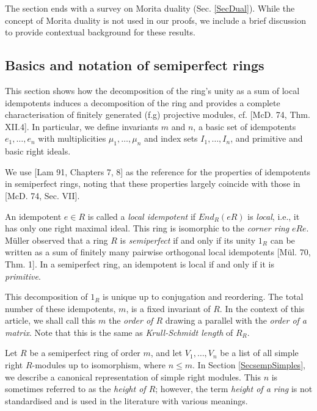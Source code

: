 \documentclass[11pt]{article}
\theoremstyle{plain}
\theoremstyle{remark}
\theoremstyle{plain}
\begin{document}
The section ends with a survey on Morita duality (Sec. \ref{SecDual}). While the concept of Morita duality is not used in our proofs, we include a brief discussion to provide contextual background for these results.


\subsection{Basics and notation of semiperfect rings}\label{SecSempNot}


This section shows how the decomposition of the ring's unity as a sum of local idempotents induces a decomposition of the ring and provides a complete characterisation of finitely generated (f.g) projective modules, cf. [McD. 74, Thm. XII.4]. In particular, we define invariants $m$ and $n$, a basic set of idempotents $e_1, \dots, e_n$ with multiplicities $\mu_1, \dots, \mu_n$ and index sets $I_1, \dots, I_n$,  and primitive and basic right ideals.

We use [Lam 91, Chapters 7, 8] as the reference for the properties of idempotents in semiperfect rings, noting that these properties largely coincide with those in [McD. 74, Sec. VII].


\smallskip 

An idempotent $e\in R$ is called a \textit{local idempotent} if $End_R(eR)$ is \textit{local}, i.e., it has only one right maximal ideal. This ring is isomorphic to the \textit{corner ring} $eRe$. Müller observed that a ring $R$ is \textit{semiperfect} if and only if its unity $1_R$ can be written as a sum of finitely many pairwise orthogonal local idempotents [Mül. 70, Thm. 1]. In a semiperfect ring, an idempotent is local if and only if it is \textit{primitive}.  


This decomposition of $1_R$ is unique up to conjugation and reordering. The total number of these idempotents, $m$, is a fixed invariant of $R$. In the context of this article, we shall call this $m$ the \textit{order of $R$} drawing a parallel with the \textit{order of a matrix}. Note that this is the same as \textit{Krull-Schmidt length} of $R_R$.


Let $R$ be a semiperfect ring of order $m$, and let $V_1,\dots, V_n$ be a list of all simple right $R$-modules up to isomorphism, where $n\leq m$. In Section \ref{SecsempSimples}, we describe a canonical representation of simple right modules.  This $n$ is sometimes referred to as the \textit{height of $R$}; however, the term \textit{height of a ring} is not standardised and is used in the literature with various meanings.
\end{document}
